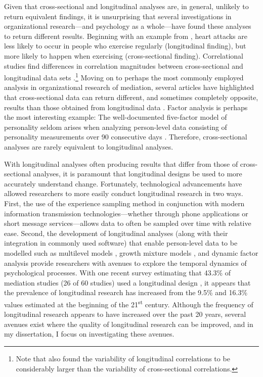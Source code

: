 \documentclass[
12pt, %
twoside,
english]{guelphthesis}
\begin{document}
Given that cross-sectional and longitudinal analyses are, in general, unlikely to return equivalent findings, it is unsurprising that several investigations in organizational research---and psychology as a whole---have found these analyses to return different results. Beginning with an example from \textcite{curran2011}, heart attacks are less likely to occur in people who exercise regularly (longitudinal finding), but more likely to happen when exercising (cross-sectional finding). Correlational studies find differences in correlation magnitudes between cross-sectional and longitudinal data sets \autocites[for a meta-analytic review, see][]{nixon2011,fisher2018}.\footnote{Note that \textcite{fisher2018} also found the variability of longitudinal correlations to be considerably larger than the variability of cross-sectional correlations.} Moving on to perhaps the most commonly employed analysis in organizational research of mediation, several articles have highlighted that cross-sectional data can return different, and sometimes completely opposite, results than those obtained from longitudinal data \autocite{cole2003,maxwell2007,maxwell2011,olaughlin2018}. Factor analysis is perhaps the most interesting example: The well-documented five-factor model of personality seldom arises when analyzing person-level data consisting of personality measurements over 90 consecutive days \autocite{hamaker2005}. Therefore, cross-sectional analyses are rarely equivalent to longitudinal analyses.

With longitudinal analyses often producing results that differ from those of cross-sectional analyses, it is paramount that longitudinal designs be used to more accurately understand change. Fortunately, technological advancements have allowed researchers to more easily conduct longitudinal research in two ways. First, the use of the experience sampling method \autocite{beal2015} in conjunction with modern information transmission technologies---whether through phone applications or short message services---allows data to often be sampled over time with relative ease. Second, the development of longitudinal analyses (along with their integration in commonly used software) that enable person-level data to be modelled such as multilevel models \autocite{raudenbush2002}, growth mixture models \autocite{wang2007}, and dynamic factor analysis \autocite{ram2013} provide researchers with avenues to explore the temporal dynamics of psychological processes. With one recent survey estimating that 43.3\% of mediation studies (26 of 60 studies) used a longitudinal design \autocite{olaughlin2018}, it appears that the prevalence of longitudinal research has increased from the 9.5\% \autocite{roe2008} and 16.3\% \autocite{mitchell2013} values estimated at the beginning of the 21\textsuperscript{st} century. Although the frequency of longitudinal research appears to have increased over the past 20 years, several avenues exist where the quality of longitudinal research can be improved, and in my dissertation, I focus on investigating these avenues.
\end{document}
